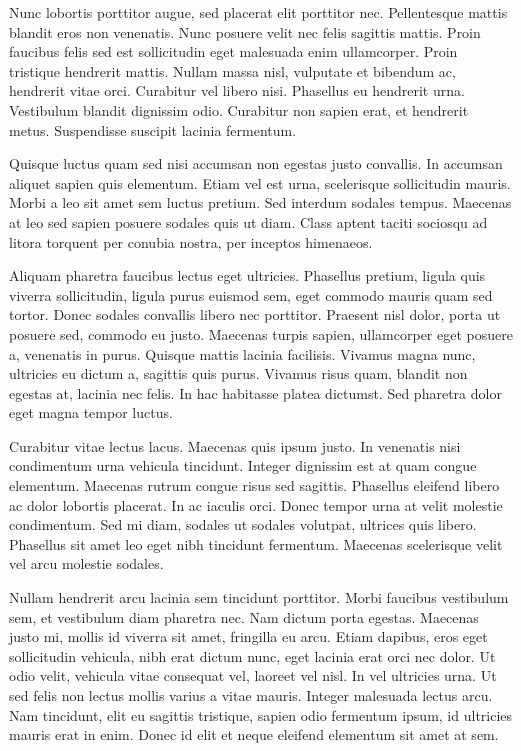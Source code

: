 \documentclass[11pt]{iopart}
\begin{document}
Nunc lobortis porttitor augue, sed placerat elit porttitor nec. Pellentesque mattis blandit eros non venenatis. Nunc posuere velit nec felis sagittis mattis. Proin faucibus felis sed est sollicitudin eget malesuada enim ullamcorper. Proin tristique hendrerit mattis. Nullam massa nisl, vulputate et bibendum ac, hendrerit vitae orci. Curabitur vel libero nisi. Phasellus eu hendrerit urna. Vestibulum blandit dignissim odio. Curabitur non sapien erat, et hendrerit metus. Suspendisse suscipit lacinia fermentum.

Quisque luctus quam sed nisi accumsan non egestas justo convallis. In accumsan aliquet sapien quis elementum. Etiam vel est urna, scelerisque sollicitudin mauris. Morbi a leo sit amet sem luctus pretium. Sed interdum sodales tempus. Maecenas at leo sed sapien posuere sodales quis ut diam. Class aptent taciti sociosqu ad litora torquent per conubia nostra, per inceptos himenaeos.

Aliquam pharetra faucibus lectus eget ultricies. Phasellus pretium, ligula quis viverra sollicitudin, ligula purus euismod sem, eget commodo mauris quam sed tortor. Donec sodales convallis libero nec porttitor. Praesent nisl dolor, porta ut posuere sed, commodo eu justo. Maecenas turpis sapien, ullamcorper eget posuere a, venenatis in purus. Quisque mattis lacinia facilisis. Vivamus magna nunc, ultricies eu dictum a, sagittis quis purus. Vivamus risus quam, blandit non egestas at, lacinia nec felis. In hac habitasse platea dictumst. Sed pharetra dolor eget magna tempor luctus.

Curabitur vitae lectus lacus. Maecenas quis ipsum justo. In venenatis nisi condimentum urna vehicula tincidunt. Integer dignissim est at quam congue elementum. Maecenas rutrum congue risus sed sagittis. Phasellus eleifend libero ac dolor lobortis placerat. In ac iaculis orci. Donec tempor urna at velit molestie condimentum. Sed mi diam, sodales ut sodales volutpat, ultrices quis libero. Phasellus sit amet leo eget nibh tincidunt fermentum. Maecenas scelerisque velit vel arcu molestie sodales.

Nullam hendrerit arcu lacinia sem tincidunt porttitor. Morbi faucibus vestibulum sem, et vestibulum diam pharetra nec. Nam dictum porta egestas. Maecenas justo mi, mollis id viverra sit amet, fringilla eu arcu. Etiam dapibus, eros eget sollicitudin vehicula, nibh erat dictum nunc, eget lacinia erat orci nec dolor. Ut odio velit, vehicula vitae consequat vel, laoreet vel nisl. In vel ultricies urna. Ut sed felis non lectus mollis varius a vitae mauris. Integer malesuada lectus arcu. Nam tincidunt, elit eu sagittis tristique, sapien odio fermentum ipsum, id ultricies mauris erat in enim. Donec id elit et neque eleifend elementum sit amet at sem.
\end{document}

